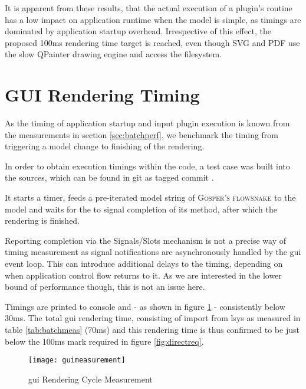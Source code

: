 It is apparent from these results, that the actual execution of a plugin's routine has a low impact on application runtime when the model is simple, as timings are dominated by application startup overhead. Irrespective of this effect, the proposed 100ms rendering time target is reached, even though SVG and PDF use the slow QPainter drawing engine and access the filesystem.

\section{GUI Rendering Timing}
As the timing of application startup and input plugin execution is known from the measurements in section \ref{sec:batchperf}, we benchmark the timing from triggering a model change to finishing of the rendering.

In order to obtain execution timings within the code, a test case was built into the sources, which can be found in \gls{git} as tagged commit .

It starts a timer, feeds a pre-iterated model string of \textsc{Gosper's flowsnake} to the model and waits for the  to signal completion of its  method, after which the rendering is finished. 

Reporting completion via the Signals/Slots mechanism is not a precise way of timing measurement as signal notifications are asynchronously handled by the \gls{gui} event loop. This can introduce additional delays to the timing, depending on when application control flow returns to it. As we are interested in the lower bound of performance though, this is not an issue here.

Timings are printed to console and - as shown in figure \ref{fig:guimeas} - consistently below 30ms. The total \gls{gui} rendering time, consisting of import from \gls{lsys} as measured in table \ref{tab:batchmeas} (70ms) and this rendering time is thus confirmed to be just below the 100ms mark required in figure \ref{fig:directreq}.

\begin{figure}
\texttt{[image: guimeasurement]}
\caption{\gls{gui} Rendering Cycle Measurement}
\label{fig:guimeas}
\end{figure}
